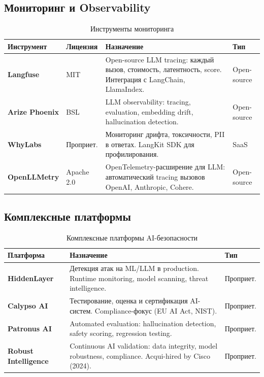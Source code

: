 \documentclass[12pt,a4paper]{article}
\begin{document}
\subsection{Мониторинг и Observability}

\begin{table}[H]
\centering
\small
\renewcommand{\arraystretch}{1.3}
\begin{tabularx}{\textwidth}{>{\bfseries\sffamily}l l X l}
\toprule
Инструмент & Лицензия & Назначение & Тип \\
\midrule
Langfuse & MIT & Open-source LLM tracing: каждый вызов, стоимость, латентность, score. Интеграция с LangChain, LlamaIndex. & Open-source \\
\addlinespace
Arize Phoenix & BSL & LLM observability: tracing, evaluation, embedding drift, hallucination detection. & Open-source \\
\addlinespace
WhyLabs & Проприет. & Мониторинг дрифта, токсичности, PII в ответах. LangKit SDK для профилирования. & SaaS \\
\addlinespace
OpenLLMetry & Apache 2.0 & OpenTelemetry-расширение для LLM: автоматический tracing вызовов OpenAI, Anthropic, Cohere. & Open-source \\
\bottomrule
\end{tabularx}
\caption{Инструменты мониторинга}
\end{table}

\subsection{Комплексные платформы}

\begin{table}[H]
\centering
\small
\renewcommand{\arraystretch}{1.3}
\begin{tabularx}{\textwidth}{>{\bfseries\sffamily}l X l}
\toprule
Платформа & Назначение & Тип \\
\midrule
HiddenLayer & Детекция атак на ML/LLM в production. Runtime monitoring, model scanning, threat intelligence. & Проприет. \\
\addlinespace
Calypso AI & Тестирование, оценка и сертификация AI-систем. Compliance-фокус (EU AI Act, NIST). & Проприет. \\
\addlinespace
Patronus AI & Automated evaluation: hallucination detection, safety scoring, regression testing. & Проприет. \\
\addlinespace
Robust Intelligence & Continuous AI validation: data integrity, model robustness, compliance. Acqui-hired by Cisco (2024). & Проприет. \\
\bottomrule
\end{tabularx}
\caption{Комплексные платформы AI-безопасности}
\end{table}
\end{document}
